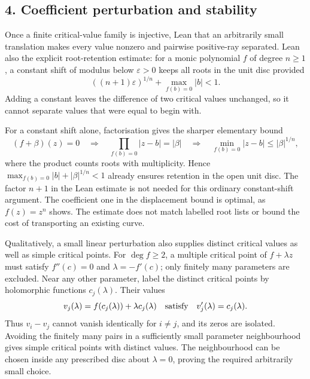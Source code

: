 \documentclass[11pt]{article}
\begin{document}
\subsection*{4. Coefficient perturbation and stability}

Once a finite critical-value family is injective, Lean
that an arbitrarily small translation makes every value nonzero and
pairwise positive-ray separated.  Lean also
the explicit root-retention estimate: for a monic polynomial $f$ of degree
$n\ge1$, a constant shift of modulus below $\varepsilon>0$ keeps all roots
in the unit disc provided
\[
 ((n+1)\varepsilon)^{1/n}+\max_{f(b)=0}|b|<1.
\]
Adding a constant leaves the difference of two critical values unchanged,
so it cannot separate values that were equal to begin with.

For a constant shift alone, factorisation gives the sharper elementary
bound
\[
 (f+\beta)(z)=0\quad\Longrightarrow\quad
 \prod_{f(b)=0}|z-b|=|\beta|
 \quad\Longrightarrow\quad
 \min_{f(b)=0}|z-b|\le|\beta|^{1/n},
\]
where the product counts roots with multiplicity. Hence
$\max_{f(b)=0}|b|+|\beta|^{1/n}<1$ already ensures retention in the
open unit disc. The factor $n+1$ in the Lean estimate is not
needed for this ordinary constant-shift argument. The coefficient one
in the displacement bound is optimal, as $f(z)=z^n$ shows. The estimate
does not match labelled root lists or bound the cost of transporting
an existing curve.

Qualitatively, a small linear perturbation also supplies distinct
critical values as well as simple critical points. For $\deg f\ge2$,
a multiple critical point of $f+\lambda z$ must satisfy
$f''(c)=0$ and $\lambda=-f'(c)$; only finitely many parameters are
excluded. Near any other parameter, label the distinct critical points
by holomorphic functions $c_j(\lambda)$. Their values
\[
 v_j(\lambda)=f(c_j(\lambda))+\lambda c_j(\lambda)
 \quad\hbox{satisfy}\quad v_j'(\lambda)=c_j(\lambda).
\]
Thus $v_i-v_j$ cannot vanish identically for $i\ne j$, and its zeros
are isolated. Avoiding the finitely many pairs in a sufficiently small
parameter neighbourhood gives simple critical points with distinct
values. The neighbourhood can be chosen inside any prescribed disc
about $\lambda=0$, proving the required arbitrarily small choice.
\end{document}
